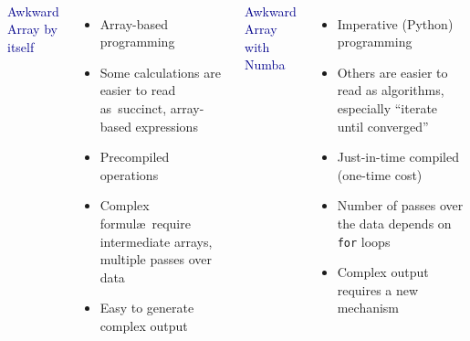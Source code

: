 \documentclass[aspectratio=169]{beamer}
\begin{document}
\begin{frame}{\mbox{ }}
\vspace{0.5 cm}
\large
\begin{columns}

\textcolor{darkblue}{\Large Awkward Array by itself}

\vspace{0.25 cm}
\begin{itemize}\setlength{\itemsep}{0.2 cm}
\item<1-> Array-based programming
\item<2-> Some calculations are easier to read \mbox{as succinct,} array-based expressions
\item<3-> Precompiled operations
\item<4-> Complex formul\ae\ require intermediate arrays, multiple passes over data
\item<5-> Easy to generate complex output \mbox{\hspace{2 cm}}
\end{itemize}

\textcolor{darkblue}{\Large Awkward Array with Numba}

\vspace{0.25 cm}
\begin{itemize}\setlength{\itemsep}{0.2 cm}
\item<1-> Imperative (Python) programming
\item<2-> Others are easier to read as algorithms, especially ``iterate until converged''
\item<3-> Just-in-time compiled (one-time cost)
\item<4-> Number of passes over the data depends on \texttt{for} loops
\item<5-> Complex output requires a new mechanism
\end{itemize}
\end{columns}
\end{frame}
\end{document}
